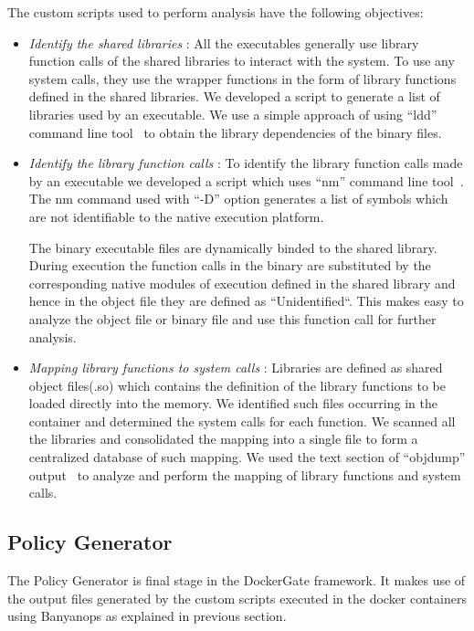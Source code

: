 The custom scripts used to perform analysis have the following objectives:
\begin{itemize}
    

\item \textit{Identify the shared libraries} : All the executables generally use library function calls of the shared libraries to interact with the system. To use any system calls, they use the wrapper functions in the form of library functions defined in the shared libraries. We developed a script to generate a list of libraries used by an executable. We use a simple approach of using “ldd” command line tool~\cite{ldd} to obtain the library dependencies of the binary files.

\item \textit{Identify the library function calls} : To identify the library function calls made by an executable we developed a script which uses “nm” command line tool~\cite{nm}. The nm command used with “-D” option generates a list of symbols which are not identifiable to the native execution platform.

The binary executable files are dynamically binded to the shared library. During execution the function calls in the binary are substituted by the corresponding native modules of execution defined in the shared library and hence in the object file they are  defined as ``Unidentified``. This makes easy to analyze the object file or binary file and use this function call for further analysis.

\item \textit{Mapping library functions to system calls} : Libraries are defined as shared object files(.so) which contains the definition of the library functions to be loaded directly into the memory. We identified such files occurring in the container and determined the system calls for each function. We scanned all the libraries and consolidated the mapping into a single file to form a centralized database of such mapping. We used the  text section of “objdump” output~\cite{objdump} to analyze and perform the mapping of library functions and system calls. 
\end{itemize} 
\subsection{Policy Generator}  

The Policy Generator is final stage in the DockerGate framework. It makes use of the output files generated by the custom scripts executed in the docker containers using Banyanops as explained in previous section.

